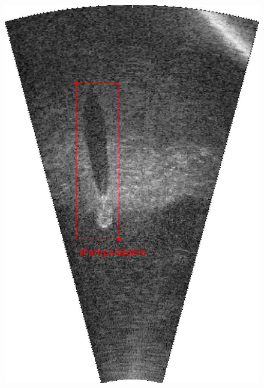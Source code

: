 \begin{figure}[t]
{        \includegraphics[height = 0.2\textheight]{chapters/images/dataset/sonar-scene-shampoo-bottle.jpg}
    }


\end{figure}
